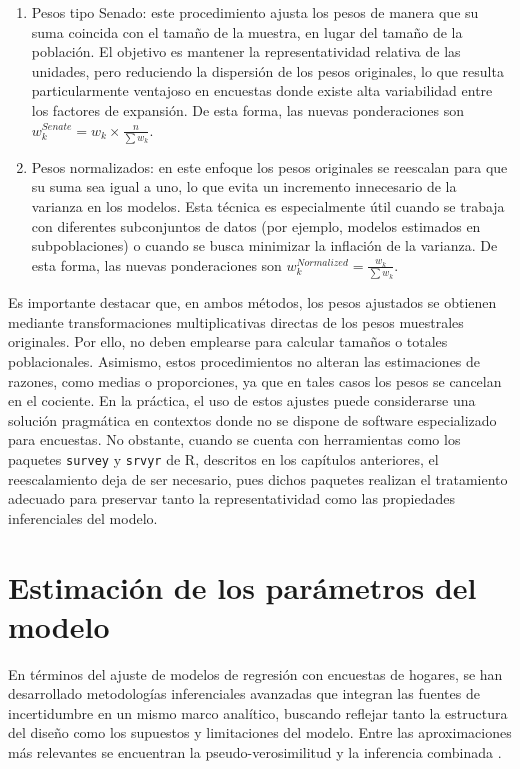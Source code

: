 \documentclass[
  spanish,
  12pt,
]{book}
\begin{document}
\begin{enumerate}
\def\labelenumi{\arabic{enumi}.}
\item
  Pesos tipo Senado: este procedimiento ajusta los pesos de manera que su suma coincida con el tamaño de la muestra, en lugar del tamaño de la población. El objetivo es mantener la representatividad relativa de las unidades, pero reduciendo la dispersión de los pesos originales, lo que resulta particularmente ventajoso en encuestas donde existe alta variabilidad entre los factores de expansión. De esta forma, las nuevas ponderaciones son \(w_k^{Senate} = w_k \times \frac{n}{\sum w_k}\).
\item
  Pesos normalizados: en este enfoque los pesos originales se reescalan para que su suma sea igual a uno, lo que evita un incremento innecesario de la varianza en los modelos. Esta técnica es especialmente útil cuando se trabaja con diferentes subconjuntos de datos (por ejemplo, modelos estimados en subpoblaciones) o cuando se busca minimizar la inflación de la varianza. De esta forma, las nuevas ponderaciones son \(w_k^{Normalized} = \frac{w_k}{\sum w_k}\).
\end{enumerate}

Es importante destacar que, en ambos métodos, los pesos ajustados se obtienen mediante transformaciones multiplicativas directas de los pesos muestrales originales. Por ello, no deben emplearse para calcular tamaños o totales poblacionales. Asimismo, estos procedimientos no alteran las estimaciones de razones, como medias o proporciones, ya que en tales casos los pesos se cancelan en el cociente. En la práctica, el uso de estos ajustes puede considerarse una solución pragmática en contextos donde no se dispone de software especializado para encuestas. No obstante, cuando se cuenta con herramientas como los paquetes \texttt{survey} \citep{Lumley2024} y \texttt{srvyr} \citep{Freedman2024} de R, descritos en los capítulos anteriores, el reescalamiento deja de ser necesario, pues dichos paquetes realizan el tratamiento adecuado para preservar tanto la representatividad como las propiedades inferenciales del modelo.

\section{Estimación de los parámetros del modelo}\label{estimacion-de-los-parametros-del-modelo}

En términos del ajuste de modelos de regresión con encuestas de hogares, se han desarrollado metodologías inferenciales avanzadas que integran las fuentes de incertidumbre en un mismo marco analítico, buscando reflejar tanto la estructura del diseño como los supuestos y limitaciones del modelo. Entre las aproximaciones más relevantes se encuentran la pseudo-verosimilitud \citep{molina1992pseudo} y la inferencia combinada \citep{binder2011estimating}.
\end{document}
